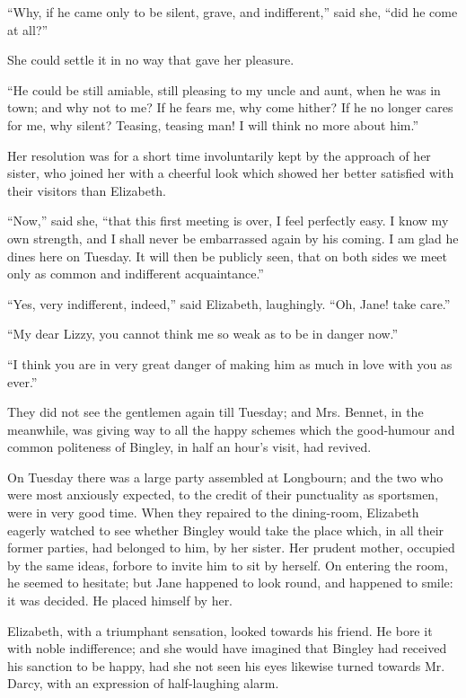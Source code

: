 \documentclass[12pt]{book}
\begin{document}
``Why, if he came only to be silent, grave, and indifferent,'' said she, ``did he come at all?''

She could settle it in no way that gave her pleasure.

``He could be still amiable, still pleasing to my uncle and aunt, when he was in town; and why not to me? If he fears me, why come hither? If he no longer cares for me, why silent? Teasing, teasing man! I will think no more about him.''

Her resolution was for a short time involuntarily kept by the approach of her sister, who joined her with a cheerful look which showed her better satisfied with their visitors than Elizabeth.

``Now,'' said she, ``that this first meeting is over, I feel perfectly easy. I know my own strength, and I shall never be embarrassed again by his coming. I am glad he dines here on Tuesday. It will then be publicly seen, that on both sides we meet only as common and indifferent acquaintance.''

``Yes, very indifferent, indeed,'' said Elizabeth, laughingly. ``Oh, Jane! take care.''

``My dear Lizzy, you cannot think me so weak as to be in danger now.''

``I think you are in very great danger of making him as much in love with you as ever.''

They did not see the gentlemen again till Tuesday; and Mrs. Bennet, in the meanwhile, was giving way to all the happy schemes which the good-humour and common politeness of Bingley, in half an hour's visit, had revived.

On Tuesday there was a large party assembled at Longbourn; and the two who were most anxiously expected, to the credit of their punctuality as sportsmen, were in very good time. When they repaired to the dining-room, Elizabeth eagerly watched to see whether Bingley would take the place which, in all their former parties, had belonged to him, by her sister. Her prudent mother, occupied by the same ideas, forbore to invite him to sit by herself. On entering the room, he seemed to hesitate; but Jane happened to look round, and happened to smile: it was decided. He placed himself by her.

Elizabeth, with a triumphant sensation, looked towards his friend. He bore it with noble indifference; and she would have imagined that Bingley had received his sanction to be happy, had she not seen his eyes likewise turned towards Mr. Darcy, with an expression of half-laughing alarm.
\end{document}
